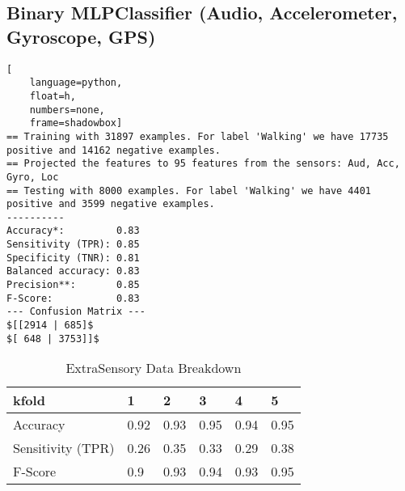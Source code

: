 \documentclass{UoNMCHA}
\numberwithin{equation}{section}
\begin{document}
\subsection{Binary MLPClassifier (Audio, Accelerometer, Gyroscope, GPS)}

\begin{lstlisting}[
    language=python,
    float=h,
    numbers=none,
    frame=shadowbox]
== Training with 31897 examples. For label 'Walking' we have 17735 positive and 14162 negative examples.
== Projected the features to 95 features from the sensors: Aud, Acc, Gyro, Loc
== Testing with 8000 examples. For label 'Walking' we have 4401 positive and 3599 negative examples.
----------
Accuracy*:         0.83
Sensitivity (TPR): 0.85
Specificity (TNR): 0.81
Balanced accuracy: 0.83
Precision**:       0.85
F-Score:           0.83
--- Confusion Matrix ---
$[[2914 | 685]$
$[ 648 | 3753]]$
\end{lstlisting}



\begin{table}[h]
    \begin{center}  
        \caption{ExtraSensory Data Breakdown \cite{Vaizman2017}}\label{tab:ExtraSensoryDataBreakdown}
        \begin{tabular}{llllll}
            \hline\hline 
                kfold             & 1    & 2    & 3    & 4    & 5    \\
                \hline 
                Accuracy          & 0.92 & 0.93 & 0.95 & 0.94 & 0.95 \\
                Sensitivity (TPR) & 0.26 & 0.35 & 0.33 & 0.29 & 0.38 \\
                F-Score           & 0.9  & 0.93 & 0.94 & 0.93 & 0.95 \\
            \hline  
            \end{tabular}
    \end{center}
\end{table}

\end{document}
